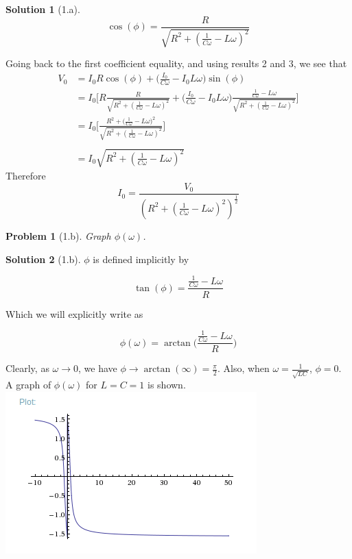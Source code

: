 \documentclass[12pt]{article}
\newtheorem*{problem}{Problem}
\theoremstyle{definition}
\newtheorem*{solution}{Solution}
\begin{document}
\begin{solution}[1.a]
\begin{equation}
\cos(\phi) = \frac{R}{\sqrt{R^2 + (\frac{1}{C\omega}-L\omega)^2}}
\end{equation}

Going back to the first coefficient equality, and using results 2 and 3, we see that
\[
\begin{aligned}
V_0 & = I_0R\cos(\phi) + \big(\frac{I_0}{C\omega}-I_0L\omega\big)\sin(\phi)\\
    & = I_0 \Big[ R\frac{R}{\sqrt{R^2 + (\frac{1}{C\omega}-L\omega)^2}} + \big(\frac{I_0}{C\omega}-I_0L\omega\big)\frac{\frac{1}{C\omega}-L\omega}{\sqrt{R^2 + (\frac{1}{C\omega}-L\omega)^2}}\Big]\\
    & = I_0 \Big[\frac{R^2 + \big(\frac{1}{C\omega}-L\omega\big)^2}{\sqrt{R^2 + (\frac{1}{C\omega}-L\omega)^2}}\Big]\\
\\
    & = I_0 \sqrt{R^2 + (\frac{1}{C\omega}-L\omega)^2}
\end{aligned}
\]
Therefore
\begin{equation}
\boxed{I_0 = \frac{V_0}{(R^2 + (\frac{1}{C\omega}-L\omega)^2)^{\frac{1}{2}}}}
\end{equation}

\end{solution}

\setcounter{equation}{0}
\begin{problem}[1.b]
Graph $\phi(\omega)$.
\end{problem}

\begin{solution}[1.b]
$\phi$ is defined implicitly by

\begin{equation}
\tan(\phi)  = \frac{\frac{1}{C\omega}-L\omega}{R}
\end{equation}

Which we will explicitly write as

\begin{equation}
\phi(\omega) = \arctan\Big(\frac{\frac{1}{C\omega}-L\omega}{R}\Big)
\end{equation}

Clearly, as $\omega \to 0$, we have $\phi \to \arctan(\infty) = \frac{\pi}{2}$.
Also, when $\omega = \frac{1}{\sqrt{LC}}$, $\phi = 0$.
\\
A graph of $\phi(\omega)$ for $L = C = 1$ is shown.\\
\includegraphics[scale=0.7]{RLC_total_phase}

\end{solution}
\end{document}
